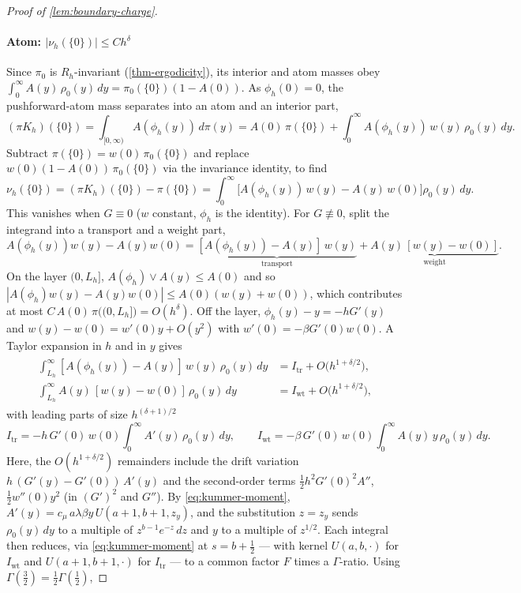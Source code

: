 \documentclass[aap,preprint]{imsart}
\numberwithin{equation}{section}
\theoremstyle{plain}
\theoremstyle{definition}
\begin{document}
\begin{proof}[Proof of \cref{lem:boundary-charge}]
\paragraph{Atom: $|\nu_h(\{0\})|\le Ch^\delta$}
Since $\pi_0$ is $R_h$-invariant (\cref{thm-ergodicity}), its interior and atom masses obey $\int_0^\infty A(y)\,\rho_0(y)\,dy=\pi_0(\{0\})(1-A(0))$.  As $\phi_h(0)=0$, the pushforward-atom mass separates into an atom and an interior part,
\[
  (\pi K_h)(\{0\})=\int_{[0,\infty)}A(\phi_h(y))\,d\pi(y)=A(0)\,\pi(\{0\})+\int_0^\infty A(\phi_h(y))\,w(y)\,\rho_0(y)\,dy.
\]
Subtract $\pi(\{0\})=w(0)\,\pi_0(\{0\})$ and replace $w(0)(1-A(0))\,\pi_0(\{0\})$ via the invariance identity, to find
\begin{equation}\label{eq:atom-closed}
  \nu_h(\{0\})=(\pi K_h)(\{0\})-\pi(\{0\})=\int_0^\infty\bigl[A(\phi_h(y))\,w(y)-A(y)\,w(0)\bigr]\rho_0(y)\,dy.
\end{equation}
This vanishes when $G\equiv0$ ($w$ constant, $\phi_h$ is the identity).  For $G\not\equiv0$, split the integrand into a transport and a weight part,
\[
  A(\phi_h(y))w(y)-A(y)w(0)
   =\underbrace{[A(\phi_h(y))-A(y)]\,w(y)}_{\text{transport}}
   +\underbrace{A(y)\,[w(y)-w(0)]}_{\text{weight}} .
\]
 On the layer $(0,L_h]$, $A(\phi_h)\vee A(y)\le A(0)$ and so $|A(\phi_h)w(y)-A(y)w(0)|\le A(0)(w(y)+w(0))$, which contributes at most $C\,A(0)\,\pi\bigl((0,L_h]\bigr)=O(h^\delta)$.  Off the layer, $\phi_h(y)-y=-hG'(y)$ and $w(y)-w(0)=w'(0)y+O(y^2)$ with $w'(0)=-\beta G'(0)w(0)$. A Taylor expansion in $h$ and in $y$ gives
\begin{gather}
  \begin{split}
  \int_{L_h}^\infty[A(\phi_h(y))-A(y)]\,w(y)\,\rho_0(y)\,dy&=I_{\mathrm{tr}}+O\bigl(h^{1+\delta/2}\bigr),\\
  \int_{L_h}^\infty A(y)\,[w(y)-w(0)]\,\rho_0(y)\,dy&=I_{\mathrm{wt}}+O\bigl(h^{1+\delta/2}\bigr),
\end{split}
\label{eq:tr-wt-expand}
\end{gather}
with leading parts of size $h^{(\delta+1)/2}$
\[
  I_{\mathrm{tr}}=-h\,G'(0)\,w(0)\!\int_0^\infty\! A'(y)\,\rho_0(y)\,dy,
  \qquad
  I_{\mathrm{wt}}=-\beta\,G'(0)\,w(0)\!\int_0^\infty\! A(y)\,y\,\rho_0(y)\,dy.
\]
Here,  the $O(h^{1+\delta/2})$ remainders include the drift variation $h\,(G'(y)-G'(0))\,A'(y)$ and the second-order terms $\tfrac12h^2G'(0)^2A''$, $\tfrac12w''(0)y^2$ (in $(G')^2$ and $G''$).  By \eqref{eq:kummer-moment}, $A'(y)=c_\mu\,a\lambda\beta y\,U(a+1,b+1,z_y)$, and the substitution $z=z_y$ sends $\rho_0(y)\,dy$ to a multiple of $z^{b-1}e^{-z}\,dz$ and $y$ to a multiple of $z^{1/2}$.  Each integral then reduces, via \eqref{eq:kummer-moment} at $s=b+\tfrac12$ --- with kernel $U(a,b,\cdot)$ for $I_{\mathrm{wt}}$ and $U(a+1,b+1,\cdot)$ for $I_{\mathrm{tr}}$ --- to a common factor $F$ times a $\Gamma$-ratio.  Using $\Gamma(\tfrac32)=\tfrac12\Gamma(\tfrac12)$,

\end{proof}
\end{document}
